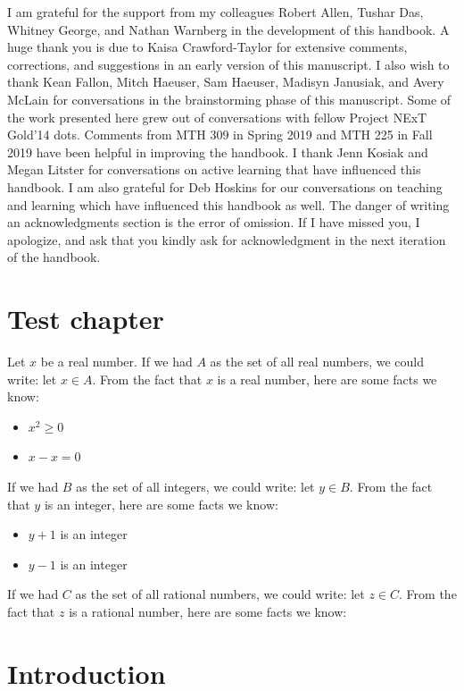 \documentclass{book}
\theoremstyle{ekimcustom}
\begin{document}
I am grateful for the support from my colleagues Robert Allen, Tushar Das, Whitney George, and Nathan Warnberg in the development of this handbook. A huge thank you is due to Kaisa Crawford-Taylor for extensive comments, corrections, and suggestions in an early version of this manuscript. I also wish to thank Kean Fallon, Mitch Haeuser, Sam Haeuser, Madisyn Janusiak, and Avery McLain for conversations in the brainstorming phase of this manuscript. Some of the work presented here grew out of conversations with fellow Project NExT Gold'14 dots. Comments from MTH 309 in Spring 2019 and MTH 225 in Fall 2019 have been helpful in improving the handbook. I thank Jenn Kosiak and Megan Litster for conversations on active learning that have influenced this handbook. I am also grateful for Deb Hoskins for our conversations on teaching and learning which have influenced this handbook as well. The danger of writing an acknowledgments section is the error of omission. If I have missed you, I apologize, and ask that you kindly ask for acknowledgment in the next iteration of the handbook.


\mainmatter

\chapter{Test chapter}
Let $x$ be a real number. If we had $A$ as the set of all real numbers, we could write: let $x \in A$. From the fact that $x$ is a real number, here are some facts we know:
\begin{itemize}
    \item $x^2 \geq 0$
    \item $x - x = 0$
\end{itemize}
If we had $B$ as the set of all integers, we could write: let $y \in B$. From the fact that $y$ is an integer, here are some facts we know:
\begin{itemize}
    \item $y+1$ is an integer
    \item $y-1$ is an integer
\end{itemize}
If we had $C$ as the set of all rational numbers, we could write: let $z \in C$. From the fact that $z$ is a rational number, here are some facts we know:

\chapter{Introduction}\label{chapter:introductory}
\end{document}
